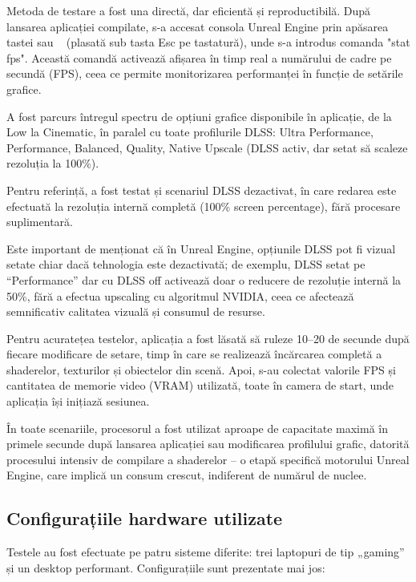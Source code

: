 Metoda de testare a fost una directă, dar eficientă și reproductibilă. După lansarea aplicației compilate, s-a accesat consola Unreal Engine prin apăsarea tastei sau ~ (plasată sub tasta Esc pe tastatură), unde s-a introdus comanda "stat fps". Această comandă activează afișarea în timp real a numărului de cadre pe secundă (FPS), ceea ce permite monitorizarea performanței în funcție de setările grafice.

A fost parcurs întregul spectru de opțiuni grafice disponibile în aplicație, de la Low la Cinematic, în paralel cu toate profilurile DLSS: Ultra Performance, Performance, Balanced, Quality, Native Upscale (DLSS activ, dar setat să scaleze rezoluția la 100\%).

Pentru referință, a fost testat și scenariul DLSS dezactivat, în care redarea este efectuată la rezoluția internă completă (100\% screen percentage), fără procesare suplimentară.

Este important de menționat că în Unreal Engine, opțiunile DLSS pot fi vizual setate chiar dacă tehnologia este dezactivată; de exemplu, DLSS setat pe “Performance” dar cu DLSS off activează doar o reducere de rezoluție internă la 50\%, fără a efectua upscaling cu algoritmul NVIDIA, ceea ce afectează semnificativ calitatea vizuală și consumul de resurse.

Pentru acuratețea testelor, aplicația a fost lăsată să ruleze 10–20 de secunde după fiecare modificare de setare, timp în care se realizează încărcarea completă a shaderelor, texturilor și obiectelor din scenă. Apoi, s-au colectat valorile FPS și cantitatea de memorie video (VRAM) utilizată, toate în camera de start, unde aplicația își inițiază sesiunea.

În toate scenariile, procesorul a fost utilizat aproape de capacitate maximă în primele secunde după lansarea aplicației sau modificarea profilului grafic, datorită procesului intensiv de compilare a shaderelor – o etapă specifică motorului Unreal Engine, care implică un consum crescut, indiferent de numărul de nuclee.

\subsection{Configurațiile hardware utilizate}

Testele au fost efectuate pe patru sisteme diferite: trei laptopuri de tip „gaming” și un desktop performant. Configurațiile sunt prezentate mai jos:

